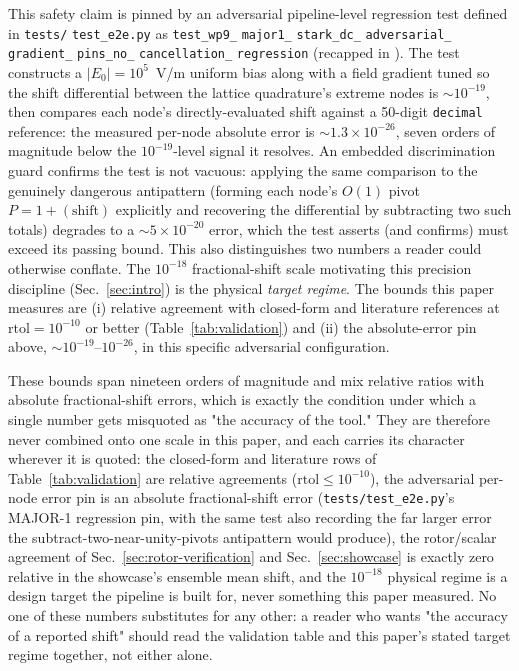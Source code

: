 \documentclass[aps,pra,superscriptaddress,groupedaddress,nofootinbib]{revtex4-2}
\begin{document}
This safety claim is pinned by an adversarial
pipeline-level regression test defined in \texttt{tests/}
\texttt{test\_e2e.py} as {\small\texttt{test\_wp9\_} \texttt{major1\_}
\texttt{stark\_dc\_} \texttt{adversarial\_} \texttt{gradient\_}
\texttt{pins\_no\_} \texttt{cancellation\_} \texttt{regression}}
(recapped in ). The test constructs a
$|E_0|=10^5$~V/m uniform bias along with a field gradient tuned so the
shift differential between the lattice quadrature's extreme nodes is
$\sim10^{-19}$, then compares each node's directly-evaluated shift
against a 50-digit \texttt{decimal} reference: the measured per-node
absolute error is $\sim1.3\times10^{-26}$, seven orders of magnitude
below the $10^{-19}$-level signal it resolves. An embedded
discrimination guard confirms the test is not vacuous: applying the same
comparison to the genuinely dangerous antipattern (forming each node's
$O(1)$ pivot $P=1+(\text{shift})$ explicitly and recovering the
differential by subtracting two such totals) degrades to a
$\sim5\times10^{-20}$ error, which the test asserts (and confirms) must
exceed its passing bound. This also distinguishes two numbers a reader
could otherwise conflate. The $10^{-18}$ fractional-shift scale
motivating this precision discipline (Sec.~\ref{sec:intro}) is the
physical \emph{target regime}. The bounds this paper measures are
(i) relative agreement with closed-form and literature references at
$\mathrm{rtol}=10^{-10}$ or better (Table~\ref{tab:validation}) and
(ii) the absolute-error pin above, $\sim10^{-19}$--$10^{-26}$, in this
specific adversarial configuration.

These bounds span nineteen orders of magnitude and mix relative ratios
with absolute fractional-shift errors, which is exactly the condition
under which a single number gets misquoted as "the accuracy of the
tool." They are therefore never combined onto one scale in this paper,
and each carries its character wherever it is quoted: the closed-form
and literature rows of Table~\ref{tab:validation} are relative
agreements ($\mathrm{rtol}\leq10^{-10}$), the adversarial per-node
error pin is an absolute fractional-shift error
(\texttt{tests/test\_e2e.py}'s MAJOR-1 regression pin, with the same
test also recording the far larger error the
subtract-two-near-unity-pivots antipattern would produce), the
rotor/scalar agreement of Sec.~\ref{sec:rotor-verification} and
Sec.~\ref{sec:showcase} is exactly zero relative in the showcase's
ensemble mean shift, and the $10^{-18}$ physical regime is a design
target the pipeline is built for, never something this paper measured.
No one of these numbers substitutes for any other: a reader who wants
"the accuracy of a reported shift" should read the validation table
and this paper's stated target regime together, not either alone.
\end{document}
